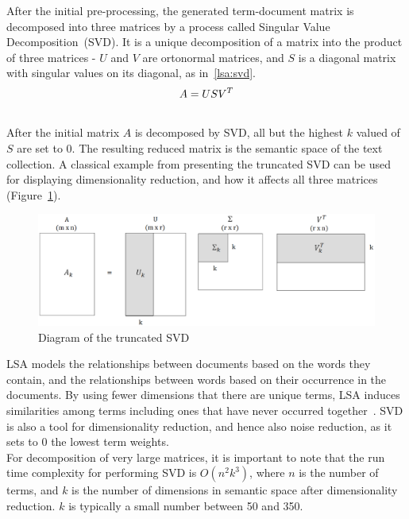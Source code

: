 After the initial pre-processing, the generated term-document matrix is decomposed into three matrices by a process called Singular Value Decomposition~(\gls{SVD}). It is a unique decomposition of a matrix into the product of three matrices - $U$ and $V$ are ortonormal matrices, and $S$ is a diagonal matrix with singular values on its diagonal, as in~\ref{lsa:svd}.\\
%
%
\begin{equation}\label{lsa:svd}
A=USV^{T}\\
\end{equation}\\

After the initial matrix $A$ is decomposed by \gls{SVD}, all but the highest $k$ valued of $S$ are set to $0$. The resulting reduced matrix is the semantic space of the text collection. A classical example from \cite{Dumais88usingLSA} presenting the truncated \gls{SVD} can be used for displaying dimensionality reduction, and how it affects all three matrices (Figure~\ref{lsa:truncated_svd}).\\

%
%
\begin{figure}[htbp]
\label{lsa:truncated_svd}
	\centering
	\includegraphics[width=\ScaleIfNeeded]{img/svd} 
	\caption{Diagram of the truncated SVD}
\end{figure}

\gls{LSA} models the relationships between documents based on the words they contain, and the relationships between words based on their occurrence in the documents. By using fewer dimensions that there are unique terms, \gls{LSA} induces similarities among terms including ones that have never occurred together~\cite{Dumais2006}. \gls{SVD} is also a tool for dimensionality reduction, and hence also noise reduction, as it sets to $0$ the lowest term weights. \\

For decomposition of very large matrices, it is important to note that the run time complexity for performing \gls{SVD} is $O(n^2k^3)$, where $n$ is the number of terms, and $k$ is the number of dimensions in semantic space after dimensionality reduction. $k$ is typically a small number between 50 and 350.\\

